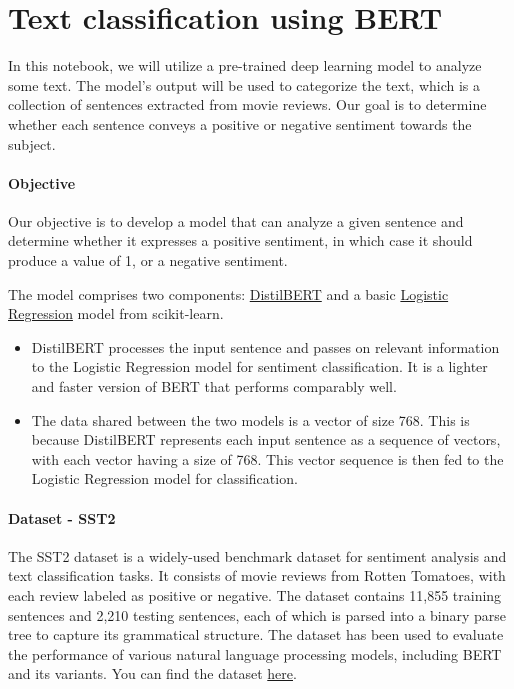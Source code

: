 \section{Text classification using
BERT}\label{text-classification-using-bert}

In this notebook, we will utilize a pre-trained deep learning model to
analyze some text. The model's output will be used to categorize the
text, which is a collection of sentences extracted from movie reviews.
Our goal is to determine whether each sentence conveys a positive or
negative sentiment towards the subject.

\paragraph{Objective}\label{objective}

Our objective is to develop a model that can analyze a given sentence
and determine whether it expresses a positive sentiment, in which case
it should produce a value of 1, or a negative sentiment.

The model comprises two components:
\href{https://huggingface.co/transformers/model_doc/distilbert.html}{DistilBERT} and a basic \href{https://scikit-learn.org/stable/modules/generated/sklearn.linear_model.LogisticRegression.html}{Logistic Regression} model from scikit-learn.

\begin{itemize}
\item DistilBERT processes the input sentence and passes on relevant
  information to the Logistic Regression model for sentiment
  classification. It is a lighter and faster version of BERT that
  performs comparably well.
\item The data shared between the two models is a vector of size 768. This
  is because DistilBERT represents each input sentence as a sequence of
  vectors, with each vector having a size of 768. This vector sequence
  is then fed to the Logistic Regression model for classification.
\end{itemize}

\paragraph{Dataset - SST2}\label{dataset---sst2}

The SST2 dataset is a widely-used benchmark dataset for sentiment
analysis and text classification tasks. It consists of movie reviews
from Rotten Tomatoes, with each review labeled as positive or negative.
The dataset contains 11,855 training sentences and 2,210 testing
sentences, each of which is parsed into a binary parse tree to capture
its grammatical structure. The dataset has been used to evaluate the
performance of various natural language processing models, including
BERT and its variants. You can find the dataset
\href{https://nlp.stanford.edu/sentiment/index.html}{here}.

